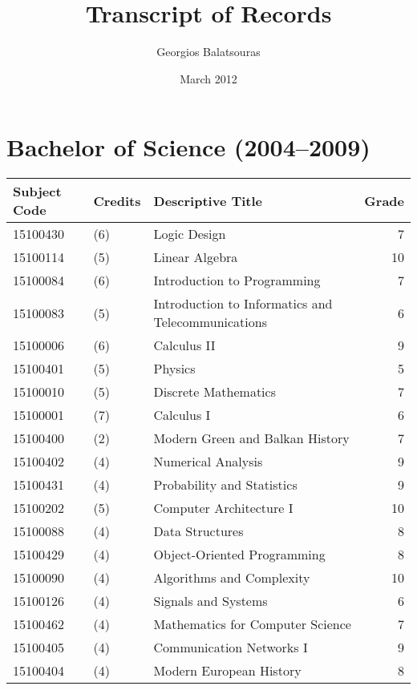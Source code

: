 \documentclass[11pt,a4paper]{article}
\begin{document}
\title{Transcript of Records}
\author{Georgios Balatsouras}
\date{March 2012}
\maketitle

\newpage

\section{Bachelor of Science (2004--2009)}
\begin{center}
  \small
  \begin{longtable}{lllr}
    \toprule
    Subject Code & Credits & Descriptive Title & Grade \\
    \midrule
    15100430 & (6) & Logic Design & 7 \\
    15100114 & (5) & Linear Algebra & 10 \\
    15100084 & (6) & Introduction to Programming & 7 \\
    15100083 & (5) & Introduction to Informatics and Telecommunications & 6 \\
    15100006 & (6) & Calculus II & 9 \\
    15100401 & (5) & Physics & 5 \\
    15100010 & (5) & Discrete Mathematics & 7 \\
    15100001 & (7) & Calculus I & 6 \\
    15100400 & (2) & Modern Green and Balkan History & 7 \\

    15100402 & (4) & Numerical Analysis & 9 \\    
    15100431 & (4) & Probability and Statistics & 9 \\
    15100202 & (5) & Computer Architecture I & 10 \\
    15100088 & (4) & Data Structures & 8 \\
    15100429 & (4) & Object-Oriented Programming & 8 \\
    15100090 & (4) & Algorithms and Complexity & 10 \\
    15100126 & (4) & Signals and Systems & 6 \\
    15100462 & (4) & Mathematics for Computer Science & 7 \\
    15100405 & (4) & Communication Networks I & 9 \\
    15100404 & (4) & Modern European History & 8 \\
    

\end{longtable}
\end{center}
\end{document}

